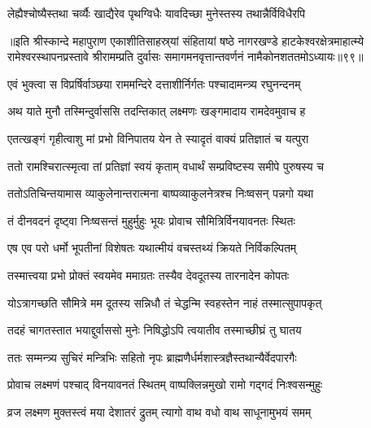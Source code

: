 \twolineshloka
{लेह्यैश्चोष्यैस्तथा चर्व्यैः खाद्यैरेव पृथग्विधैः}
{यावदिच्छा मुनेस्तस्य तथान्नैर्विविधैरपि}%

॥इति श्रीस्कान्दे महापुराण एकाशीतिसाहस्र्यां संहितायां षष्ठे नागरखण्डे हाटकेश्वरक्षेत्रमाहात्म्ये रामेश्वरस्थापनप्रस्तावे श्रीरामम्प्रति दुर्वासः समागमनवृत्तान्तवर्णनं नामैकोनशततमोऽध्यायः॥९९॥

\resetShloka


\twolineshloka
{एवं भुक्त्वा स विप्रर्षिर्वाञ्छया राममन्दिरे}
{दत्ताशीर्निर्गतः पश्चादामन्त्र्य रघुनन्दनम्}%

\twolineshloka
{अथ याते मुनौ तस्मिन्दुर्वाससि तदन्तिकात्}
{लक्ष्मणः खङ्गमादाय रामदेवमुवाच ह}%

\twolineshloka
{एतत्खङ्गं गृहीत्वाशु मां प्रभो विनिपातय}
{येन ते स्यादृतं वाक्यं प्रतिज्ञातं च यत्पुरा}%

\twolineshloka
{ततो रामश्चिरात्स्मृत्वा तां प्रतिज्ञां स्वयं कृताम्}
{वधार्थं सम्प्रविष्टस्य समीपे पुरुषस्य च}%

\twolineshloka
{ततोऽतिचिन्तयामास व्याकुलेनान्तरात्मना}
{बाष्पव्याकुलनेत्रश्च निःष्वसन् पन्नगो यथा}%

\twolineshloka
{तं दीनवदनं दृष्ट्वा निःष्वसन्तं मुहुर्मुहुः}
{भूयः प्रोवाच सौमित्रिर्विनयावनतः स्थितः}%

\twolineshloka
{एष एव परो धर्मो भूपतीनां विशेषतः}
{यथात्मीयं वचस्तथ्यं क्रियते निर्विकल्पितम्}%

\twolineshloka
{तस्मात्त्वया प्रभो प्रोक्तं स्वयमेव ममाग्रतः}
{तस्यैव देवदूतस्य तारनादेन कोपतः}%

\twolineshloka
{योऽत्रागच्छति सौमित्रे मम दूतस्य सन्निधौ}
{तं चेद्धन्मि स्वहस्तेन नाहं तस्मात्सुपापकृत्}%

\twolineshloka
{तदहं चागतस्तात भयाद्दुर्वाससो मुनेः}
{निषिद्धोऽपि त्वयातीव तस्माच्छीघ्रं तु घातय}%

\twolineshloka
{ततः सम्मन्त्र्य सुचिरं मन्त्रिभिः सहितो नृपः}
{ब्राह्मणैर्धर्मशास्त्रज्ञैस्तथान्यैर्वेदपारगैः}%

\twolineshloka
{प्रोवाच लक्ष्मणं पश्चाद् विनयावनतं स्थितम्}
{वाष्पक्लिन्नमुखो रामो गद्गदं निःश्वसन्मुहुः}%

\twolineshloka
{व्रज लक्ष्मण मुक्तस्त्वं मया देशातरं द्रुतम्}
{त्यागो वाथ वधो वाथ साधूनामुभयं समम्}%

